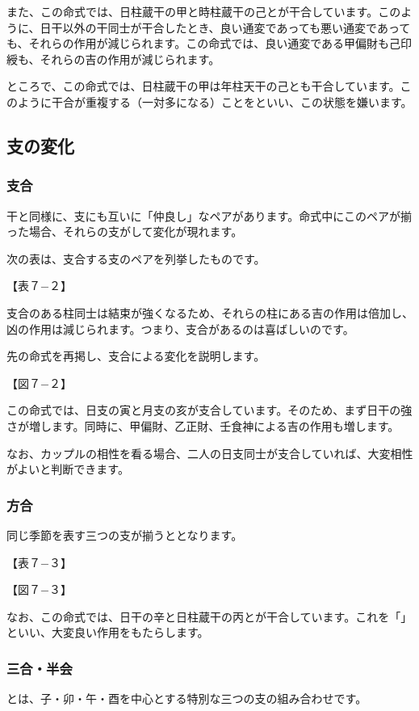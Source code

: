 \documentclass[a5paper,11pt,dvipdfmx]{tarticle}
\begin{document}
また、この命式では、日柱蔵干の甲と時柱蔵干の己とが干合しています。このように、日干以外の干同士が干合したとき、良い通変であっても悪い通変であっても、それらの作用が減じられます。この命式では、良い通変である甲偏財も己印綬も、それらの吉の作用が減じられます。

ところで、この命式では、日柱蔵干の甲は年柱天干の己とも干合しています。このように干合が重複する（一対多になる）ことをといい、この状態を嫌います。

\subsection{支の変化}

\subsubsection*{支合}
干と同様に、支にも互いに「仲良し」なペアがあります。命式中にこのペアが揃った場合、それらの支がして変化が現れます。

次の表は、支合する支のペアを列挙したものです。

【表７−２】

支合のある柱同士は結束が強くなるため、それらの柱にある吉の作用は倍加し、凶の作用は減じられます。つまり、支合があるのは喜ばしいのです。

先の命式を再掲し、支合による変化を説明します。

【図７−２】

この命式では、日支の寅と月支の亥が支合しています。そのため、まず日干の強さが増します。同時に、甲偏財、乙正財、壬食神による吉の作用も増します。

なお、カップルの相性を看る場合、二人の日支同士が支合していれば、大変相性がよいと判断できます。

\subsubsection*{方合}
同じ季節を表す三つの支が揃うととなります。

【表７−３】

【図７−３】

なお、この命式では、日干の辛と日柱蔵干の丙とが干合しています。これを「」といい、大変良い作用をもたらします。

\subsubsection*{三合・半会}
とは、子・卯・午・酉を中心とする特別な三つの支の組み合わせです。
\end{document}
